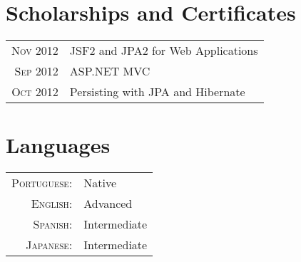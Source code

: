 \documentclass[a4paper,10pt]{article}
\begin{document}
\section{Scholarships and Certificates}
\begin{tabular}{rl}
 \textsc{Nov} 2012 & JSF2 and JPA2 for Web Applications\\
\textsc{Sep} 2012 & ASP.NET MVC\\
\textsc{Oct} 2012 & Persisting with JPA and Hibernate\\
\end{tabular}

\section{Languages}
\begin{tabular}{rl}
 \textsc{Portuguese:}&Native\\
\textsc{English:}&Advanced\\
\textsc{Spanish:}&Intermediate\\
\textsc{Japanese:}&Intermediate\\
\end{tabular}


\end{document}
